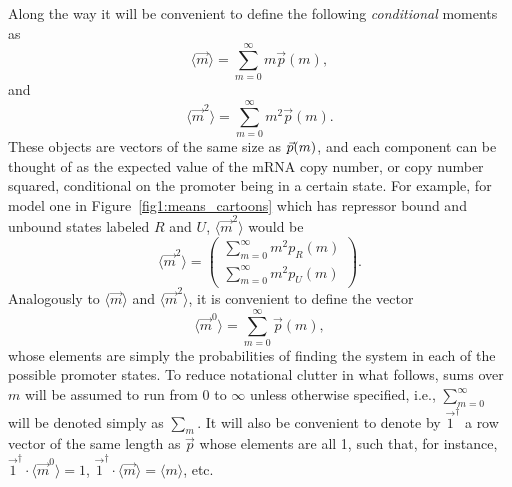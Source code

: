Along the way it will be convenient to define the following
\textit{conditional} moments as
\begin{equation}
\langle\vec{m}\rangle = \sum_{m=0}^\infty m \vec{p}(m),
\end{equation}
and
\begin{equation}
\langle\vec{m}^2\rangle = \sum_{m=0}^\infty m^2 \vec{p}(m).
\end{equation}
These objects are vectors of the same size as $\vec{p}(m)$, and each component
can be thought of as the expected value of the mRNA copy number, or copy number
squared, conditional on the promoter being in a certain state. For example, for
model one in Figure~\ref{fig1:means_cartoons} which has repressor bound and
unbound states labeled $R$ and $U$, $\langle\vec{m}^2\rangle$ would be
\begin{equation}
\langle\vec{m}^2\rangle
= \begin{pmatrix} \sum_{m=0}^\infty m^2 p_R(m)
                \\ \sum_{m=0}^\infty m^2 p_U(m) \end{pmatrix}.
\end{equation}
Analogously to $\langle\vec{m}\rangle$ and $\langle\vec{m}^2\rangle$,
it is convenient to define the vector
\begin{equation}
\langle\vec{m}^0\rangle = \sum_{m=0}^\infty \vec{p}(m),
\end{equation}
whose elements are simply the probabilities of finding the system in each of the
possible promoter states. To reduce notational clutter in what follows, sums
over $m$ will be assumed to run from 0 to $\infty$ unless otherwise specified,
i.e., $\sum_{m=0}^\infty$ will be denoted simply as $\sum_m$. It will also be
convenient to denote by $\vec{1}^\dagger$ a row vector of the same length as
$\vec{p}$ whose elements are all 1, such that, for instance, $\vec{1}^\dagger
\cdot \langle\vec{m}^0\rangle = 1$, $\vec{1}^\dagger \cdot \langle\vec{m}\rangle
= \langle{m}\rangle$, etc.

